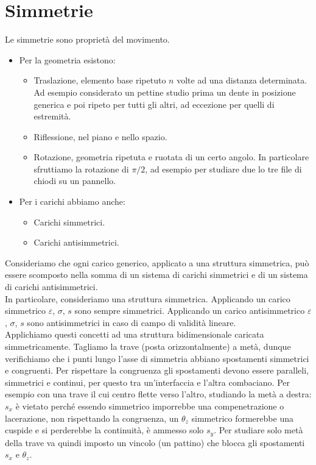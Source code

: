\section{Simmetrie}

Le simmetrie sono proprietà del movimento.
\begin{itemize}
    \item Per la geometria esistono:
    \begin{itemize}
        \item Traslazione, elemento base ripetuto $n$ volte ad una distanza determinata. 
        Ad esempio considerato un pettine studio prima un dente in posizione generica e poi ripeto per tutti gli altri, ad eccezione per quelli di estremità.\\
        \item Riflessione, nel piano e nello spazio.\\
        \item Rotazione, geometria ripetuta e ruotata di un certo angolo. In particolare sfruttiamo la rotazione di $\pi/2$, ad esempio per studiare due lo tre file di chiodi su un pannello.
    \end{itemize}
    \item Per i carichi abbiamo anche:
    \begin{itemize}
        \item Carichi simmetrici.\\
        \item Carichi antisimmetrici.
    \end{itemize}
\end{itemize}

Consideriamo che ogni carico generico, applicato a una struttura simmetrica, può essere scomposto nella somma di un sistema di carichi simmetrici e di un sistema di carichi antisimmetrici.\\

In particolare, consideriamo una struttura simmetrica. Applicando un carico simmetrico $\varepsilon$, $\sigma$, $s$ sono sempre simmetrici. Applicando un carico antisimmetrico $\varepsilon$, $\sigma$, $s$  sono antisimmetrici in caso di campo di validità lineare.\\

Applichiamo questi concetti ad una struttura bidimensionale caricata simmetricamente. Tagliamo la trave (posta orizzontalmente) a metà, dunque verifichiamo che i punti lungo l'asse di simmetria abbiano spostamenti simmetrici e congruenti. Per rispettare la congruenza gli spostamenti devono essere paralleli, simmetrici e continui, per questo tra un'interfaccia e l'altra combaciano. Per esempio con una trave il cui centro flette verso l'altro, studiando la metà a destra: $s_x$ è vietato perché essendo simmetrico imporrebbe una compenetrazione o lacerazione, non rispettando la congruenza, un $\theta_z$ simmetrico formerebbe una cuspide e si perderebbe la continuità, è ammesso solo $s_y$. Per studiare solo metà della trave va quindi imposto un vincolo (un pattino) che blocca gli spostamenti $s_x$ e $\theta_z$.

